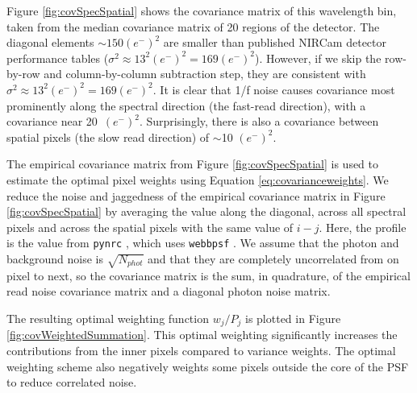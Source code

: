 \documentclass[]{aastex62}
\begin{document}
Figure \ref{fig:covSpecSpatial} shows the covariance matrix of this wavelength bin, taken from the median covariance matrix of 20 regions of the detector.
The diagonal elements $\sim 150 (e^-)^2$ are smaller than published NIRCam detector performance tables ($\sigma^2 \approx 13^2 (e^-)^2=169 (e^-)^2$).
However, if we skip the row-by-row and column-by-column subtraction step, they are consistent with $\sigma^2 \approx 13^2 (e^-)^2=169 (e^-)^2$.
It is clear that 1/f noise causes covariance most prominently along the spectral direction (the fast-read direction), with a covariance near 20~$(e^-)^2$.
Surprisingly, there is also a covariance between spatial pixels (the slow read direction) of $\sim$10 $(e^-)^2$.

The empirical covariance matrix from Figure \ref{fig:covSpecSpatial} is used to estimate the optimal pixel weights using Equation \ref{eq:covarianceweights}.
We reduce the noise and jaggedness of the empirical covariance matrix in Figure \ref{fig:covSpecSpatial} by averaging the value along the diagonal, across all spectral pixels and across the spatial pixels with the same value of $i -j$.
Here, the profile is the value from \texttt{pynrc} \citep{leisenring2020pynrc0p8dev}, which uses \texttt{webbpsf} \citep{perrin2014webbpsf}.
We assume that the photon and background noise is $\sqrt{N_{phot}}$ and that they are completely uncorrelated from on pixel to next, so the covariance matrix is the sum, in quadrature, of the empirical read noise covariance matrix and a diagonal photon noise matrix.

The resulting optimal weighting function $w_j/P_j$ is plotted in Figure \ref{fig:covWeightedSummation}.
This optimal weighting significantly increases the contributions from the inner pixels compared to variance weights.
The optimal weighting scheme also negatively weights some pixels outside the core of the PSF to reduce correlated noise.
\end{document}
